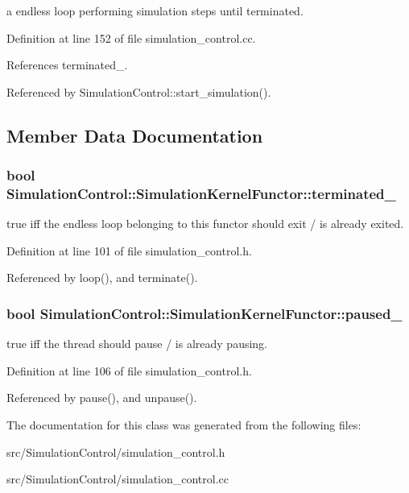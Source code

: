 a endless loop performing simulation steps until terminated. 

Definition at line 152 of file simulation\_\-control.cc.

References terminated\_\-.

Referenced by SimulationControl::start\_\-simulation().

\subsection{Member Data Documentation}
\hypertarget{class_simulation_control_1_1_simulation_kernel_functor_0803093cc15c83a7b85044ae2d630270}{
\subsubsection[terminated\_\-]{\setlength{\rightskip}{0pt plus 5cm}bool {\bf SimulationControl::SimulationKernelFunctor::terminated\_\-}}}
\label{class_simulation_control_1_1_simulation_kernel_functor_0803093cc15c83a7b85044ae2d630270}


true iff the endless loop belonging to this functor should exit / is already exited. 

Definition at line 101 of file simulation\_\-control.h.

Referenced by loop(), and terminate().\hypertarget{class_simulation_control_1_1_simulation_kernel_functor_c0b1b92a6a04db5775afbcbae5a734ec}{
\subsubsection[paused\_\-]{\setlength{\rightskip}{0pt plus 5cm}bool {\bf SimulationControl::SimulationKernelFunctor::paused\_\-}}}
\label{class_simulation_control_1_1_simulation_kernel_functor_c0b1b92a6a04db5775afbcbae5a734ec}


true iff the thread should pause / is already pausing. 

Definition at line 106 of file simulation\_\-control.h.

Referenced by pause(), and unpause().

The documentation for this class was generated from the following files:\begin{CompactItemize}
\item 
src/SimulationControl/simulation\_\-control.h\item 
src/SimulationControl/simulation\_\-control.cc\end{CompactItemize}
